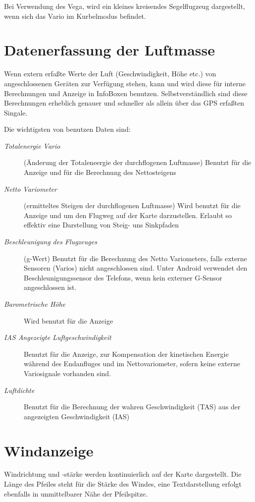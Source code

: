 Bei Verwendung des \textsf{Vega}, wird ein kleines kreisendes Segelflugzeug dargestellt, wenn sich das Vario
im Kurbelmodus befindet.
\section{Datenerfassung der Luftmasse}%

Wenn extern erfaßte Werte der Luft (Geschwindigkeit, Höhe etc.) von angeschlossenen Geräten zur Verfügung
stehen, kann und wird \xc diese für interne Berechnungen und Anzeige in InfoBoxen benutzen.
Selbstverständlich sind diese Berechnungen erheblich genauer und schneller als allein über das GPS
erfaßten Singale.

Die wichtigsten von  \xc benutzen Daten sind:
\begin{description}
\item[\textit{Totalenergie Vario}]
(Änderung der Totaleneergie der durchflogenen Luftmasse)
Benutzt für die Anzeige und für die Berechnung des Nettosteigens
\item[\textit{Netto Variometer}]
(ermitteltes Steigen der durchflogenen Luftmasse)
Wird benutzt für die Anzeige und um den Flugweg auf der Karte darzustellen.
Erlaubt so effektiv eine Darstellung von Steig- uns Sinkpfaden
\item[\textit{Beschleunigung des Flugzeuges}]
(g-Wert) Benutzt für die Berechnung des Netto Variometers, falls externe Sensoren (Varios) nicht angeschlossen sind.
Unter Android verwendet \xc den Beschleunigungssensor des Telefons, wenn kein externer G-Sensor angeschlossen ist.
\item[\textit{Barometrische Höhe}] Wird benutzt für die Anzeige
\item[\textit{IAS Angezeigte Luftgeschwindigkeit}]
Benutzt für die Anzeige, zur Kompensation der kinetischen Energie während des Endanfluges  und im Nettovariometer,
sofern keine externe Variosignale vorhanden sind.
\item[\textit{Luftdichte}] Benutzt für die Berechnung der wahren Geschwindigkeit (TAS) aus der angezeigten Geschwindigkeit (IAS)
\end{description}
\section{Windanzeige}
Windrichtung und -stärke werden kontinuierlich auf der Karte dargestellt.
Die Länge des Pfeiles steht für die Stärke des Windes, eine Textdarstellung erfolgt
ebenfalls in unmittelbarer Nähe der Pfeilspitze.

